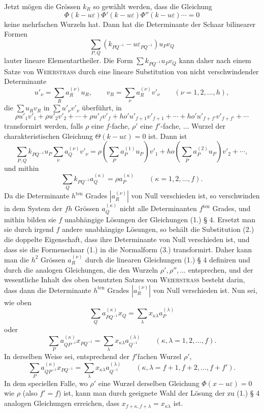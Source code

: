 \documentclass[11pt]{article}
\newcommand{\eps}{\varepsilon}
\newcommand{\ten}{\mathrm{ten}}
\begin{document}
Jetzt mögen die Grössen $k_R$ so gewählt werden, dass die Gleichung
\[
\Phi(k-u\eps)\Phi'(k-u\eps)\Phi''(k-u\eps)\cdots=0
\]
keine mehrfachen Wurzeln hat. Dann hat die Determinante der Schaar bilinearer Formen
\begin{equation}\tag{1.}
\sum_{P,Q}(k_{PQ^{-1}}-u\eps_{PQ^{-1}})u_Pv_Q
\end{equation}
lauter lineare Elementartheiler. Die Form $\sum k_{PQ^{-1}}u_Pv_Q$ kann daher nach einem Satze von \textsc{Weierstrass} durch eine lineare Substitution von nicht verschwindender Determinante
\begin{equation}\tag{2.}
u'_\nu=\sum_R a^{(\nu)}_R u_R,\qquad v_R=\sum_\nu a^{(\nu)}_R v'_\nu\qquad(\nu=1,2,\ldots,h),
\end{equation}
die $\sum u_Rv_R$ in $\sum u'_\nu v'_\nu$ überführt, in
\begin{equation}\tag{3.}
\rho u'_1v'_1+\rho u'_2v'_2+\cdots+\rho u'_fv'_f+
ho'u'_{f+1}v'_{f+1}+\cdots+
ho'u'_{f+f'}v'_{f+f'}+\cdots
\end{equation}
transformirt werden, falls $\rho$ eine $f$-fache, $\rho'$ eine $f'$-fache, $\ldots$ Wurzel der charakteristischen Gleichung $\Theta(k-u\eps)=0$ ist. Dann ist
\[
\sum_{P,Q}k_{PQ^{-1}}u_P\sum_\nu a^{(\nu)}_Qv'_\nu
=\rho\left(\sum_P a^{(1)}_P u_P\right)v'_1+
ho\left(\sum_P a^{(2)}_P u_P\right)v'_2+\cdots,
\]
und mithin
\[
\sum_Q k_{PQ^{-1}}a^{(\kappa)}_Q=\rho a^{(\kappa)}_P\qquad(\kappa=1,2,\ldots,f).
\]
Da die Determinante $h^{\ten}$ Grades $|a^{(\nu)}_R|$ von Null verschieden ist, so verschwinden in dem System der $fh$ Grössen $a^{(\kappa)}_Q$ nicht alle Determinanten $f^{\ten}$ Grades, und mithin bilden sie $f$ unabhängige Lösungen der Gleichungen (1.) § 4. Ersetzt man sie durch irgend $f$ andere unabhängige Lösungen, so behält die Substitution (2.) die doppelte Eigenschaft, dass ihre Determinante von Null verschieden ist, und dass sie die Formenschaar (1.) in die Normalform (3.) transformirt. Daher kann man die $h^2$ Grössen $a^{(\nu)}_R$ durch die linearen Gleichungen (1.) § 4 definiren und durch die analogen Gleichungen, die den Wurzeln $\rho',\rho'',\ldots$ entsprechen, und der wesentliche Inhalt des oben benutzten Satzes von \textsc{Weierstrass} besteht darin, dass dann die Determinante $h^{\ten}$ Grades $|a^{(\nu)}_R|$ von Null verschieden ist. Nun sei, wie oben
\[
\sum_Q a^{(\kappa)}_{PQ^{-1}}x_Q=\sum_\lambda x_{\kappa\lambda}a^{(\lambda)}_P
\]
oder
\[
\sum_P a^{(\kappa)}_{QP^{-1}}x_{PQ^{-1}}=\sum_\lambda x_{\kappa\lambda}a^{(\lambda)}_{Q^{-1}}\qquad(\kappa,\lambda=1,2,\ldots,f).
\]
In derselben Weise sei, entsprechend der $f'$fachen Wurzel $\rho'$,
\[
\sum_P a^{(\kappa)}_{QP^{-1}}x_{PQ^{-1}}=\sum_\lambda x_{\kappa\lambda}a^{(\lambda)}_{Q^{-1}}\qquad(\kappa,\lambda=f+1,f+2,\ldots,f+f').
\]
In dem speciellen Falle, wo $\rho'$ eine Wurzel derselben Gleichung $\Phi(x-u\eps)=0$ wie $\rho$ (also $f'=f$) ist, kann man durch geeignete Wahl der Lösung der zu (1.) § 4 analogen Gleichungen erreichen, dass $x_{f+\kappa,f+\lambda}=x_{\kappa\lambda}$ ist.
\end{document}
